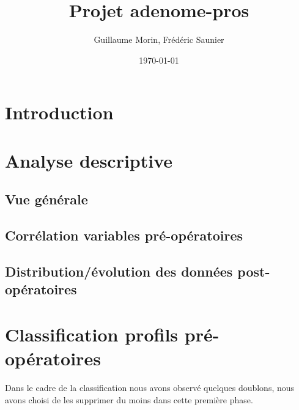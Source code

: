 \documentclass[12pt]{article}
\title{Projet  adenome-pros}
\author{Guillaume Morin, Frédéric Saunier}
\date{\today}
\begin{document}
\maketitle
\tableofcontents
\clearpage



\section{Introduction}
\listoffigures
\newpage 

\newpage

\section{Analyse descriptive}

\subsection{Vue générale}
  

\subsection{Corrélation variables pré-opératoires}
  

\subsection{Distribution/évolution des données post-opératoires}
  
  
  
\newpage




\section{Classification profils pré-opératoires}

Dans le cadre de la classification nous avons observé quelques doublons, nous avons choisi de les supprimer 
du moins dans cette première phase. 
\end{document}
